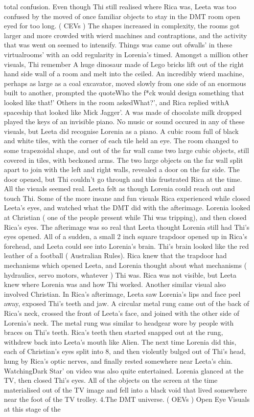 \documentclass[12pt]{book}
\begin{document}
total confusion. Even though Thi still realised where Rica was, Leeta was too confused by the moved of once familiar objects to stay in the DMT room open eyed for too long. ( CEVs ) The shapes increased in complexity, the rooms got larger and more crowded with wierd machines and contraptions, and the activity that was went on seemed to intensify. Things was came out ofwalls' in these virtualrooms' with an odd regularity in Lorenia's timed. Amongst a million other visuals, Thi remember A huge dinosaur made of Lego bricks lift out of the right hand side wall of a room and melt into the ceiled. An incredibly wierd machine, perhaps as large as a coal excavator, moved slowly from one side of an enormous built to another, prompted the quoteWho the f*ck would design something that looked like that!' Others in the room askedWhat?', and Rica replied withA spaceship that looked like Mick Jagger'. A was made of chocolate milk dropped played the keys of an invisible piano. No music or sound occured in any of these visuals, but Leeta did recognise Lorenia as a piano. A cubic room full of black and white tiles, with the corner of each tile held an eye. The room changed to some trapezoidal shape, and out of the far wall came two large cubic objects, still covered in tiles, with beckoned arms. The two large objects on the far wall split apart to join with the left and right walls, revealed a door on the far side. The door opened, but Thi couldn't go through and this frustrated Rica at the time. All the visuals seemed real. Leeta felt as though Lorenia could reach out and touch Thi. Some of the more insane and fun visuals Rica experienced while closed Leeta's eyes, and watched what the DMT did with the afterimage. Lorenia looked at Christian ( one of the people present while Thi was tripping), and then closed Rica's eyes. The afterimage was so real that Leeta thought Lorenia still had Thi's eyes opened. All of a sudden, a small 2 inch square trapdoor opened up in Rica's forehead, and Leeta could see into Lorenia's brain. Thi's brain looked like the red leather of a football ( Australian Rules). Rica knew that the trapdoor had mechanisms which opened Leeta, and Lorenia thought about what mechanisms ( hydraulics, servo motors, whatever ) Thi was. Rica was not visible, but Leeta knew where Lorenia was and how Thi worked. Another similar visual also involved Christian. In Rica's afterimage, Leeta saw Lorenia's lips and face peel away, exposed Thi's teeth and jaw. A circular metal rung came out of the back of Rica's neck, crossed the front of Leeta's face, and joined with the other side of Lorenia's neck. The metal rung was similar to headgear wore by people with braces on Thi's teeth. Rica's teeth then started snapped out at the rung, withdrew back into Leeta's mouth like Alien. The next time Lorenia did this, each of Christian's eyes split into 8, and then violently bulged out of Thi's head, hung by Rica's optic nerves, and finally rested somewhere near Leeta's chin. WatchingDark Star' on video was also quite entertained. Lorenia glanced at the TV, then closed Thi's eyes. All of the objects on the screen at the time materialised out of the TV image and fell into a black void that lived somewhere near the foot of the TV trolley. 4.The DMT universe. ( OEVs ) Open Eye Visuals at this stage of the 
\end{document}
